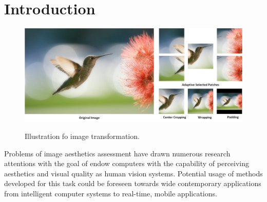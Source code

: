 \documentclass[10pt,twocolumn,letterpaper]{article}
\begin{document}
\section{Introduction} \label{intro}

\begin{figure}
	\centering
	\includegraphics[scale=0.2]{figures/intro}
	\label{transform}
	\caption{Illustration fo image transformation.}
\end{figure}
Problems of image aesthetics assessment 
have drawn numerous research attentions with the goal of 
endow computers with the capability of perceiving aesthetics and
visual quality as human vision systems. Potential usage
of methods developed for this task could be foreseen
towards wide contemporary applications from intelligent computer
systems to real-time, mobile applications. 
\end{document}
